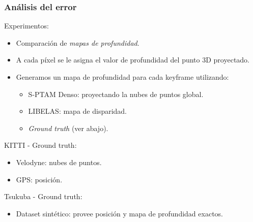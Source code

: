 \begin{frame}
	\frametitle{Análisis del error}
	
	\vspace{-1em}
	Experimentos:
	\begin{itemize}
		\item Comparación de \emph{mapas de profundidad}.
		\item A cada píxel se le asigna el valor de profundidad del punto 3D proyectado.
		\item Generamos un mapa de profundidad para cada keyframe utilizando:
		\begin{itemize}
			\item S-PTAM Denso: proyectando la nubes de puntos global.
			\item LIBELAS: mapa de disparidad.
			\item \emph{Ground truth} (ver abajo).
		\end{itemize}
	\end{itemize}

	\vspace{1em}
	\pause{}	
	KITTI - Ground truth:
	\begin{itemize}
		\item Velodyne: nubes de puntos.
		\item GPS: posición.
	\end{itemize}
	
	\vspace{1em}
	Tsukuba - Ground truth:
	\begin{itemize}
		\item Dataset sintético: provee posición y mapa de profundidad exactos.
	\end{itemize}
	
\end{frame}



